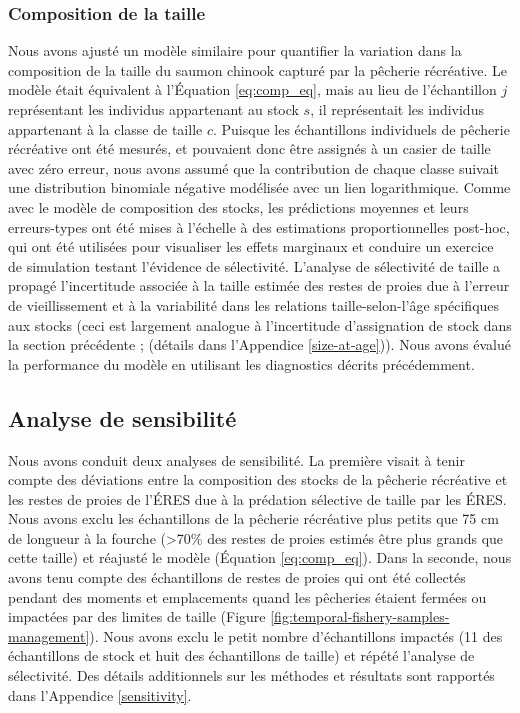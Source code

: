 \subsubsection{Composition de la taille}

Nous avons ajusté un modèle similaire pour quantifier la variation dans la composition de la taille du saumon chinook capturé par la pêcherie récréative. Le modèle était équivalent à l'Équation \ref{eq:comp_eq}, mais au lieu de l'échantillon $j$ représentant les individus appartenant au stock $s$, il représentait les individus appartenant à la classe de taille $c$. Puisque les échantillons individuels de pêcherie récréative ont été mesurés, et pouvaient donc être assignés à un casier de taille avec zéro erreur, nous avons assumé que la contribution de chaque classe suivait une distribution binomiale négative \citep[`NB1', ][]{hilbeNegativeBinomialRegression2011} modélisée avec un lien logarithmique. Comme avec le modèle de composition des stocks, les prédictions moyennes et leurs erreurs-types ont été mises à l'échelle à des estimations proportionnelles post-hoc, qui ont été utilisées pour visualiser les effets marginaux et conduire un exercice de simulation testant l'évidence de sélectivité. L'analyse de sélectivité de taille a propagé l'incertitude associée à la taille estimée des restes de proies due à l'erreur de vieillissement et à la variabilité dans les relations taille-selon-l'âge spécifiques aux stocks (ceci est largement analogue à l'incertitude d'assignation de stock dans la section précédente ; (détails dans l'Appendice \ref{size-at-age})). Nous avons évalué la performance du modèle en utilisant les diagnostics décrits précédemment.

\subsection{Analyse de sensibilité}

Nous avons conduit deux analyses de sensibilité. La première visait à tenir compte des déviations entre la composition des stocks de la pêcherie récréative et les restes de proies de l'ÉRES due à la prédation sélective de taille par les ÉRES. Nous avons exclu les échantillons de la pêcherie récréative plus petits que 75 cm de longueur à la fourche (>70\% des restes de proies estimés être plus grands que cette taille) et réajusté le modèle (Équation \ref{eq:comp_eq}). Dans la seconde, nous avons tenu compte des échantillons de restes de proies qui ont été collectés pendant des moments et emplacements quand les pêcheries étaient fermées ou impactées par des limites de taille (Figure \ref{fig:temporal-fishery-samples-management}). Nous avons exclu le petit nombre d'échantillons impactés (11 des échantillons de stock et huit des échantillons de taille) et répété l'analyse de sélectivité. Des détails additionnels sur les méthodes et résultats sont rapportés dans l'Appendice \ref{sensitivity}.